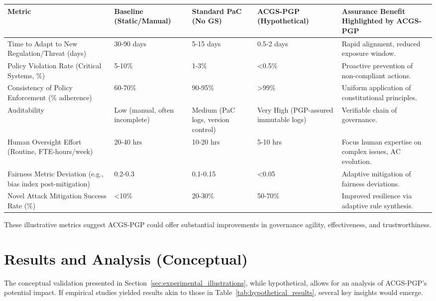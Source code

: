 \documentclass[sigconf,review,anonymous=false]{acmart} %
\begin{document}
\begin{table*}[t]
  \caption{Hypothetical Key Results \& Assurance Benefits of ACGS-PGP (Conceptual Validation)}
  \label{tab:hypothetical_results}
  \begin{tabular}{@{}lllll@{}}
    \toprule
    Metric                                       & Baseline (Static/Manual) & Standard PaC (No GS) & ACGS-PGP (Hypothetical) & Assurance Benefit Highlighted by ACGS-PGP \\
    \midrule
    Time to Adapt to New Regulation/Threat (days) & 30-90 days & 5-15 days & 0.5-2 days & Rapid alignment, reduced exposure window. \\
    Policy Violation Rate (Critical Systems, \%)   & 5-10\%     & 1-3\%     & <0.5\%     & Proactive prevention of non-compliant actions. \\
    Consistency of Policy Enforcement (\% adherence) & 60-70\%    & 90-95\%   & >99\%      & Uniform application of constitutional principles. \\
    Auditability & Low (manual, often incomplete) & Medium (PaC logs, version control) & Very High (PGP-assured immutable logs) & Verifiable chain of governance. \\
    Human Oversight Effort (Routine, FTE-hours/week) & 20-40 hrs  & 10-20 hrs & 5-10 hrs   & Focus human expertise on complex issues, AC evolution. \\
    Fairness Metric Deviation (e.g., bias index post-mitigation) & 0.2-0.3  & 0.1-0.15  & <0.05 & Adaptive mitigation of fairness deviations. \\
    Novel Attack Mitigation Success Rate (\%) & <10\%      & 20-30\%   & 50-70\%    & Improved resilience via adaptive rule synthesis. \\
    \bottomrule
  \end{tabular}
\end{table*}

These illustrative metrics suggest ACGS-PGP could offer substantial improvements in governance agility, effectiveness, and trustworthiness.

\section{Results and Analysis (Conceptual)}
\label{sec:results_analysis}
The conceptual validation presented in Section~\ref{sec:experimental_illustrations}, while hypothetical, allows for an analysis of ACGS-PGP's potential impact. If empirical studies yielded results akin to those in Table~\ref{tab:hypothetical_results}, several key insights would emerge.
\end{document}
